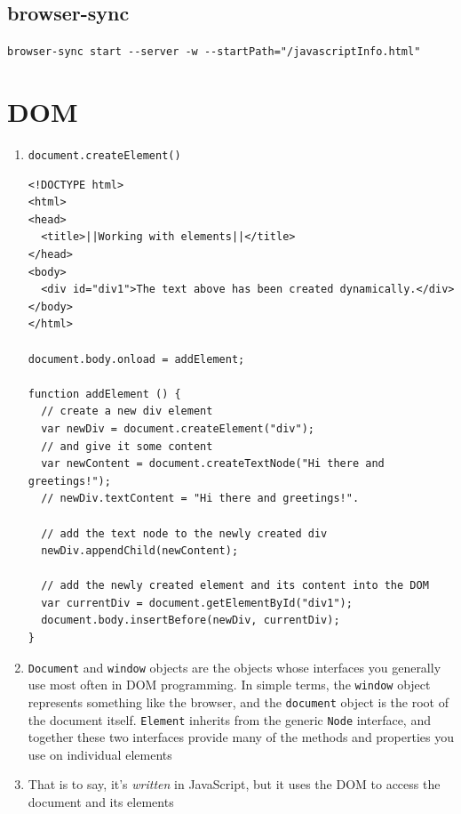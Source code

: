 \documentclass[a4paper, 12pt]{article}
\begin{document}
\subsection{browser-sync}
\verb|browser-sync start --server -w --startPath="/javascriptInfo.html"|

\section{DOM}
\begin{enumerate}

\item \verb|document.createElement()|
\begin{verbatim}
<!DOCTYPE html>
<html>
<head>
  <title>||Working with elements||</title>
</head>
<body>
  <div id="div1">The text above has been created dynamically.</div>
</body>
</html>

document.body.onload = addElement;

function addElement () { 
  // create a new div element 
  var newDiv = document.createElement("div"); 
  // and give it some content 
  var newContent = document.createTextNode("Hi there and greetings!"); 
  // newDiv.textContent = "Hi there and greetings!".
  
  // add the text node to the newly created div
  newDiv.appendChild(newContent);  

  // add the newly created element and its content into the DOM 
  var currentDiv = document.getElementById("div1"); 
  document.body.insertBefore(newDiv, currentDiv); 
}
\end{verbatim}

\item \verb|Document| and \verb|window| objects are the objects whose interfaces you generally use most often in DOM programming. In simple terms, the \verb|window| object represents something like the browser, and the \verb|document| object is the root of the document itself. \verb|Element| inherits from the generic \verb|Node| interface, and together these two interfaces provide many of the methods and properties you use on individual elements

\item That is to say, it's \textit{written} in JavaScript, but it uses the DOM to access the document and its elements
\end{enumerate}
\end{document}
